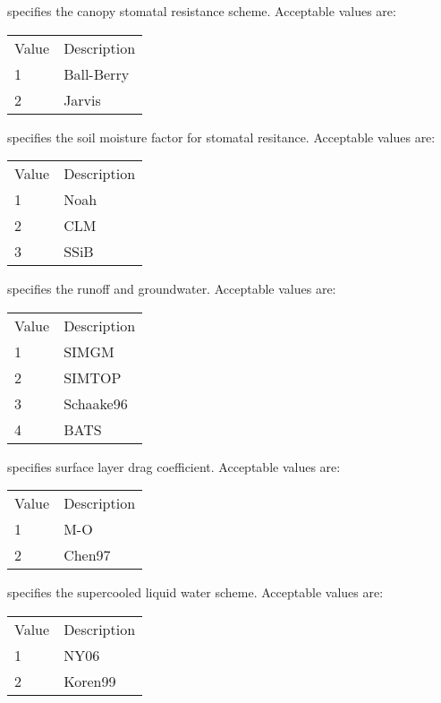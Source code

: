   specifies the canopy stomatal resistance
 scheme.  Acceptable values are:

 \begin{tabular}{ll}
 Value & Description \\
  1    & Ball-Berry  \\
  2    & Jarvis      \\
 \end{tabular}
 
  specifies the soil moisture factor for
 stomatal resitance.  Acceptable values are:

 \begin{tabular}{ll}
 Value & Description \\
  1    & Noah        \\
  2    & CLM         \\
  3    & SSiB        \\
 \end{tabular}

  specifies the runoff and groundwater.
 Acceptable values are:

 \begin{tabular}{ll}
 Value & Description \\
  1    & SIMGM       \\
  2    & SIMTOP      \\
  3    & Schaake96   \\
  4    & BATS        \\
 \end{tabular}

  specifies surface layer drag coefficient.
 Acceptable values are:

 \begin{tabular}{ll}
 Value & Description \\
  1    & M-O         \\
  2    & Chen97      \\
 \end{tabular}

  specifies the supercooled liquid water scheme.
 Acceptable values are:

 \begin{tabular}{ll}
 Value & Description \\
  1    & NY06        \\
  2    & Koren99     \\
 \end{tabular}

